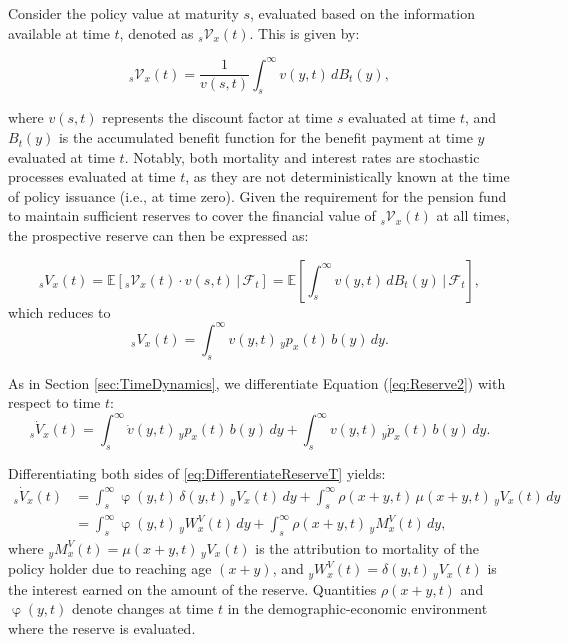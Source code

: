 \documentclass[12pt]{article}
\begin{document}
Consider the policy value at maturity \( s \), evaluated based on the information available at time \( t \), denoted as \({}_s\mathcal{V}_x(t)\). This is given by:

\[
{}_s\mathcal{V}_x(t) = \frac{1}{v(s, t)} \int_s^{\infty} v(y, t) \, dB_t(y),
\]

where \( v(s, t) \) represents the discount factor at time \( s \) evaluated at time \( t \), and \( B_t(y) \) is the accumulated benefit function for the benefit payment at time \( y \) evaluated at time \( t \). Notably, both mortality and interest rates are stochastic processes evaluated at time \( t \), as they are not deterministically known at the time of policy issuance (i.e., at time zero). Given the requirement for the pension fund to maintain sufficient reserves to cover the financial value of \({}_s\mathcal{V}_x(t)\) at all times, the prospective reserve can then be expressed as:

\begin{equation}\label{eq:Reserve1}
	{}_sV_x(t) = \mathbb{E}[{}_s\mathcal{V}_x(t) \cdot v(s,t) \,|\, \mathcal{F}_t] = \mathbb{E} \left[ \int_s^\infty v(y,t) \, dB_t(y) \,|\, \mathcal{F}_t \right],
\end{equation}
which reduces to
\begin{equation}\label{eq:Reserve2}
	{}_sV_x(t) = \int_s^\infty v(y,t) \, {}_yp_x(t) \, b(y) \, dy.
\end{equation}

As in Section \ref{sec:TimeDynamics}, we differentiate Equation (\ref{eq:Reserve2}) with respect to time $t$:
\begin{equation}\label{eq:DifferentiateReserveT}
	{}_s\dot{V}_x(t) = \int_s^\infty \dot{v}(y,t) \, {}_yp_x(t) \, b(y) \, dy + \int_s^\infty v(y,t) \, {}_y\dot{p}_x(t) \, b(y) \, dy.
\end{equation}

Differentiating both sides of \ref{eq:DifferentiateReserveT} yields:
\begin{equation}\label{eq:DifferentiateReserveT2}
	\begin{split}
		{}_s\dot{V}_x(t) &= \int_s^\infty \upvarphi(y,t) \, \delta(y,t) \, {}_yV_x(t) \, dy + \int_s^\infty \rho(x+y,t) \, \mu(x+y,t) \, {}_yV_x(t) \, dy \\ 
		&= \int_s^\infty \upvarphi(y,t) \, {}_yW^V_x(t) \, dy + \int_s^\infty \rho(x+y,t) \, {}_yM^V_x(t) \, dy,
	\end{split}
\end{equation}
where ${}_yM^V_x(t) = \mu(x+y,t) \, {}_yV_x(t)$ is the attribution to mortality of the policy holder due to reaching age $(x+y)$, and ${}_yW^V_x(t) = \delta(y,t) \, {}_yV_x(t)$ is the interest earned on the amount of the reserve. Quantities $\rho(x+y,t)$ and $\upvarphi(y,t)$ denote changes at time $t$ in the demographic-economic environment where the reserve is evaluated. 
\end{document}

